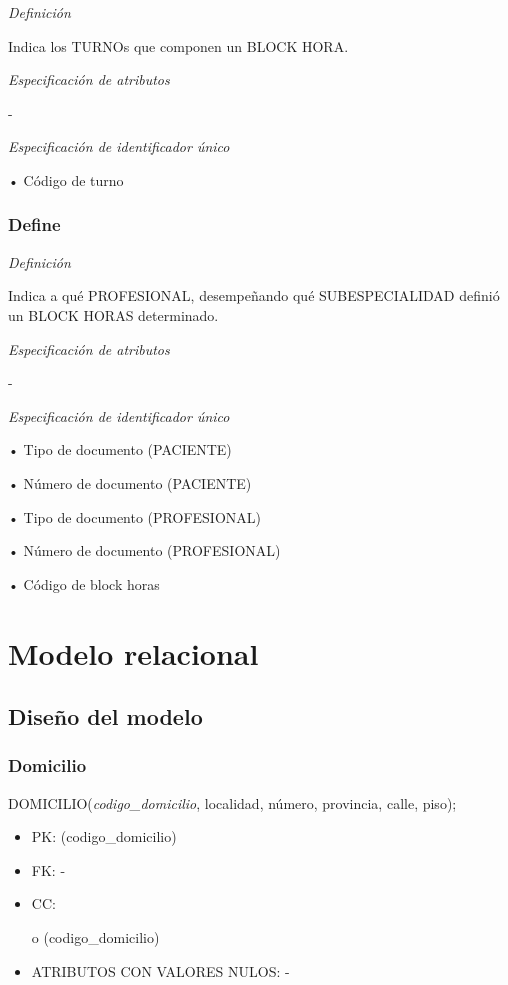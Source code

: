\documentclass[a4paper,11pt]{article}
\begin{document}
\textit{Definición}

Indica los TURNOs que componen un BLOCK HORA.

\textit{Especificación de atributos}

-

\textit{Especificación de identificador único}

• Código de turno\label{HToc293405829}

\subsubsection{\textbf{Define}}

\textit{Definición}

Indica a qué PROFESIONAL, desempeñando qué SUBESPECIALIDAD definió un BLOCK 
HORAS determinado.

\textit{Especificación de atributos}

-

\textit{Especificación de identificador único}

• Tipo de documento (PACIENTE)

• Número de documento (PACIENTE)

• Tipo de documento (PROFESIONAL)

• Número de documento (PROFESIONAL)

• Código de block horas\pagebreak{}\label{HToc293405830}

\section{\textbf{Modelo relacional\label{HToc293405831}}}

\subsection{\textbf{Diseño del modelo\label{HToc293405832}}}

\subsubsection{\textbf{Domicilio}}

DOMICILIO(\emph{codigo\_domicilio}, localidad, número, provincia, calle, piso);
\begin{itemize}
\item PK: (codigo\_domicilio)

\item FK: -

\item CC:

o (codigo\_domicilio)

\item ATRIBUTOS CON VALORES NULOS: -\label{HToc293405833}
\end{itemize}
\end{document}
